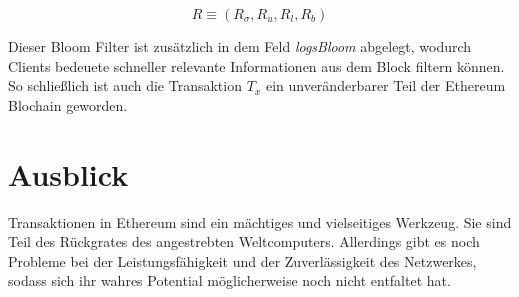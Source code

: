\documentclass[runningheads]{llncs}
\begin{document}
$$
R \equiv (R_{\sigma}, R_u, R_l, R_b)
$$

Dieser Bloom Filter ist zusätzlich in dem Feld \textit{logsBloom} abgelegt, wodurch Clients bedeuete schneller relevante Informationen aus dem Block filtern können. \cite[S. 5]{wood_ethereum_nodate} So schließlich ist auch die Transaktion $ T_x $ ein unveränderbarer Teil der Ethereum Blochain geworden.

\section{Ausblick}
Transaktionen in Ethereum sind ein mächtiges und vielseitiges Werkzeug. Sie sind Teil des Rückgrates des angestrebten Weltcomputers. Allerdings gibt es noch Probleme bei der Leistungsfähigkeit und der Zuverlässigkeit des Netzwerkes, sodass sich ihr wahres Potential möglicherweise noch nicht entfaltet hat.




\end{document}

